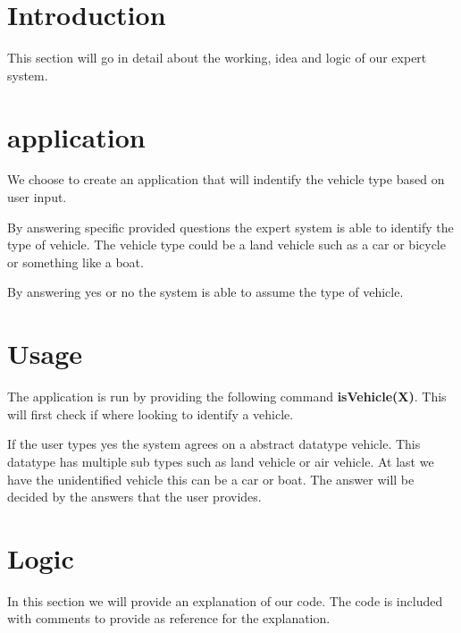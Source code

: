 \section{Introduction} \label{man-introduction}
This section will go in detail about the working, idea and logic of our expert system.

\section{application} \label{man-application}
We choose to create an application that will indentify the vehicle type based on user input.

By answering specific provided questions the expert system is able to identify the type of vehicle.
The vehicle type could be a land vehicle such as a car or bicycle or something like a boat.

By answering yes or no the system is able to assume the type of vehicle.


\section{Usage} \label{man-usage}
The application is run by providing the following command \textbf{isVehicle(X)}.
This will first check if where looking to identify a vehicle.

If the user types yes the system agrees on a abstract datatype vehicle.
This datatype has multiple sub types such as land vehicle or air vehicle. At last we have the unidentified
vehicle this can be a car or boat.
The answer will be decided by the answers that the user provides.

\newpage
\section{Logic} \label{man-logic}
In this section we will provide an explanation of our code.
The code is included with comments to provide as reference for the explanation.

